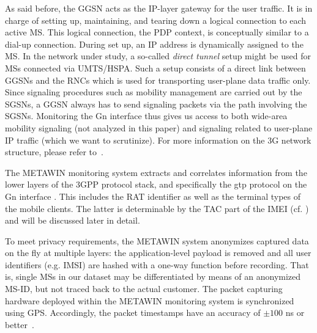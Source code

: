 As said before, the \gls{GGSN} acts as the IP-layer gateway for the user traffic. It is in charge of setting up,
maintaining, and tearing down a logical connection to each active \gls{MS}. This logical connection, the \gls{PDP} context,
is conceptually similar to a dial-up connection. During set up, an
IP address is dynamically assigned to the \gls{MS}.
In the network under study, a so-called \textit{direct tunnel} setup might be used for \glspl{MS} connected
via \gls{UMTS}/\gls{HSPA}. Such a setup consists of a direct link between \glspl{GGSN} and the
\glspl{RNC} %
which is used for
transporting user-plane data traffic only. Since signaling procedures such
as mobility management are carried out by the \glspl{SGSN}, a \gls{GGSN} always has to send signaling packets
via the path involving the \glspl{SGSN}. Monitoring the Gn interface thus gives us access to both wide-area mobility signaling (not analyzed in this paper) %
and signaling related to user-plane IP traffic (which we want to scrutinize).
For more information on the \gls{3G} network structure, please refer to~\cite{bannister_convergence_2004}.

The METAWIN monitoring system extracts and correlates information from the lower
layers of the \gls{3GPP} protocol stack, and specifically the \gls{gtp} protocol
on the Gn interface \cite{3gpp.29.060}. This includes the \acrfull{RAT} identifier as well as the terminal types of the mobile clients. The
latter is determinable by the \acrfull{TAC} part of the \acrfull{IMEI} (cf. \cite{3gpp.23.003}) and will be discussed later in detail.

To meet privacy requirements, the METAWIN system anonymizes captured data on the fly at multiple
layers: the application-level payload is removed and all user identifiers (e.g. \gls{IMSI}) are
hashed with a one-way function before recording. That is, single
\glspl{MS} in our dataset may be differentiated by means of an anonymized \gls{MS-ID}, but not traced back to the actual customer.
The packet capturing hardware deployed within the METAWIN monitoring system is synchronized
using \gls{GPS}. Accordingly, the packet timestamps
have an accuracy of $\pm100$ ns or better~\cite[p.97-98]{donnelly_high_2002}.



